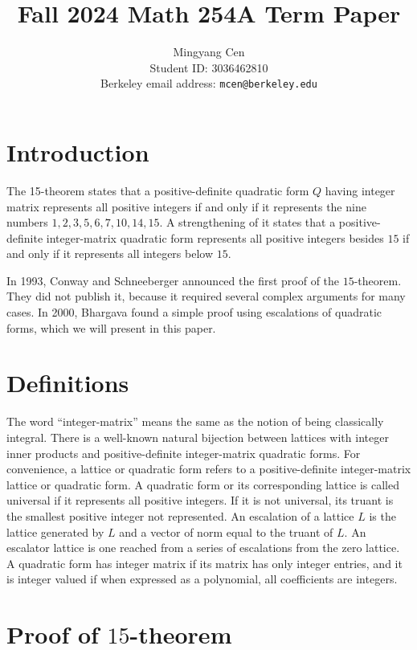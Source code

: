 \documentclass{article}
\title{Fall 2024 Math 254A Term Paper}
\author{Mingyang Cen \\ Student ID: 3036462810 \\ Berkeley email address: \texttt{mcen@berkeley.edu}}
\begin{document}
\maketitle

\section{Introduction}
The 15-theorem states that a positive-definite quadratic form $Q$ having integer matrix represents all positive integers if and only if it represents the nine numbers $1, 2, 3, 5, 6, 7, 10, 14, 15$. A strengthening of it states that a positive-definite integer-matrix quadratic form represents all positive integers besides $15$ if and only if it represents all integers below $15$.

In 1993, Conway and Schneeberger announced the first proof of the $15$-theorem. They did not publish it, because it required several complex arguments for many cases. In 2000, Bhargava \cite{fifteen} found a simple proof using escalations of quadratic forms, which we will present in this paper.

\section{Definitions}
The word ``integer-matrix'' means the same as the notion of being classically integral. There is a well-known natural bijection between lattices with integer inner products and positive-definite integer-matrix quadratic forms. For convenience, a lattice or quadratic form refers to a positive-definite integer-matrix lattice or quadratic form. A quadratic form or its corresponding lattice is called universal if it represents all positive integers. If it is not universal, its truant is the smallest positive integer not represented. An escalation of a lattice $L$ is the lattice generated by $L$ and a vector of norm equal to the truant of $L$. An escalator lattice is one reached from a series of escalations from the zero lattice. A quadratic form has integer matrix if its matrix has only integer entries, and it is integer valued if when expressed as a polynomial, all coefficients are integers.

\section{Proof of $15$-theorem}
\end{document}
